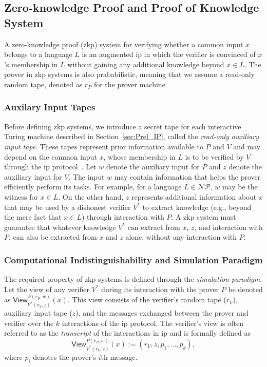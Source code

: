 \subsection{Zero-knowledge Proof and Proof of Knowledge System}

A zero-knowledge proof (\gls{zkp}) system for verifying whether a common input \( x \) belongs to a language \( L \) is an augmented \gls{ip} in which the verifier is convinced of \( x \)'s membership in \( L \) without gaining any additional knowledge beyond \( x \in L \). The prover in \gls{zkp} systems is also prababilistic, meaning that we assume a read-only random tape, denoted as $r_P$ for the prover machine. 

\subsubsection{Auxilary Input Tapes}
Before defining \gls{zkp} systems, we introduce a secret tape for each interactive Turing machine described in Section~\ref{sec:Prel_IP}, called the \textit{read-only auxiliary input tape}. These tapes represent prior information available to \( P \) and \( V \) and may depend on the common input \( x \), whose membership in \( L \) is to be verified by \( V \) through the \gls{ip} protocol~\cite{Goldreich2001Book}. Let \( w \) denote the auxiliary input for \( P \) and \( z \) denote the auxiliary input for \( V \). The input \( w \) may contain information that helps the prover efficiently perform its tasks. For example, for a language \( L \in \mathcal{NP} \), \( w \) may be the witness for \( x \in L \). 
On the other hand, \( z \) represents additional information about \( x \) that may be used by a dishonest verifier \( V^* \) to extract knowledge (e.g., beyond the mere fact that \( x \in L \)) through interaction with \( P \). A \gls{zkp} system must guarantee that whatever knowledge \( V^* \) can extract from \( x \), \( z \), and interaction with \( P \), can also be extracted from \( x \) and \( z \) alone, without any interaction with \( P \).  

\subsubsection{Computational Indistinguishability and Simulation Paradigm}  
The required property of \gls{zkp} systems is defined through the \textit{simulation paradigm}. Let the view of any verifier $V^*$ during its interaction with the prover $P$ be denoted as  
\(
\textsf{View}_{V^*(r_V, z)}^{P(r_P, w)}(x).
\)
This view consists of the verifier's random tape ($r_V$), auxiliary input tape ($z$), and the messages exchanged between the prover and verifier over the $k$ interactions of the \gls{ip} protocol. The verifier's view is often referred to as the \textit{transcript} of the interactions in \gls{ip} and is formally defined as  
\[
\textsf{View}_{V^*(r_V, z)}^{P(r_P, w)}(x) := (r_V, z, p_1, \dots, p_k),
\]  
where $p_i$ denotes the prover's $i$th message.

